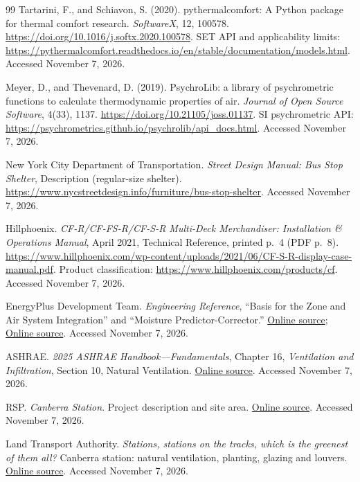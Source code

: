 \documentclass[12pt]{article}
\begin{document}
\begin{thebibliography}{99}
Tartarini, F., and Schiavon, S. (2020).
pythermalcomfort: A Python package for thermal comfort research.
\emph{SoftwareX}, 12, 100578.
\url{https://doi.org/10.1016/j.softx.2020.100578}.
SET API and applicability limits:
\url{https://pythermalcomfort.readthedocs.io/en/stable/documentation/models.html}.
Accessed November 7, 2026.

Meyer, D., and Thevenard, D. (2019).
PsychroLib: a library of psychrometric functions to calculate thermodynamic properties of air.
\emph{Journal of Open Source Software}, 4(33), 1137.
\url{https://doi.org/10.21105/joss.01137}.
SI psychrometric API:
\url{https://psychrometrics.github.io/psychrolib/api_docs.html}.
Accessed November 7, 2026.

New York City Department of Transportation.
\emph{Street Design Manual: Bus Stop Shelter}, Description (regular-size shelter).
\url{https://www.nycstreetdesign.info/furniture/bus-stop-shelter}.
Accessed November 7, 2026.

Hillphoenix. \emph{CF-R/CF-FS-R/CF-S-R Multi-Deck Merchandiser: Installation \& Operations Manual}, April 2021, Technical Reference, printed p.~4 (PDF p.~8).
\url{https://www.hillphoenix.com/wp-content/uploads/2021/06/CF-S-R-display-case-manual.pdf}.
Product classification: \url{https://www.hillphoenix.com/products/cf}.
Accessed November 7, 2026.

EnergyPlus Development Team. \emph{Engineering Reference},
``Basis for the Zone and Air System Integration'' and ``Moisture Predictor-Corrector.''
\href{https://energyplus.readthedocs.io/en/latest/guides/engineering-reference/2.1-basis-for-the-zone-and-air-system-integration.html}{Online source};
\href{https://energyplus.readthedocs.io/en/latest/guides/engineering-reference/2.4-moisture-predictor-corrector.html}{Online source}.
Accessed November 7, 2026.

ASHRAE. \emph{2025 ASHRAE Handbook---Fundamentals}, Chapter 16,
\emph{Ventilation and Infiltration}, Section 10, Natural Ventilation.
\href{https://handbook.ashrae.org/Handbooks/F25/SI/F25_Ch16/F25_Ch16_si.aspx}{Online source}.
Accessed November 7, 2026.

RSP. \emph{Canberra Station}. Project description and site area.
\href{https://rsp.design/project/canberrastation/}{Online source}. Accessed November 7, 2026.

Land Transport Authority. \emph{Stations, stations on the tracks, which is the greenest of them all?}
Canberra station: natural ventilation, planting, glazing and louvers.
\href{https://www.lta.gov.sg/content/ltagov/en/who_we_are/statistics_and_publications/Connect/greenmrtstations.html}{Online source}.
Accessed November 7, 2026.


\end{thebibliography}
\end{document}
